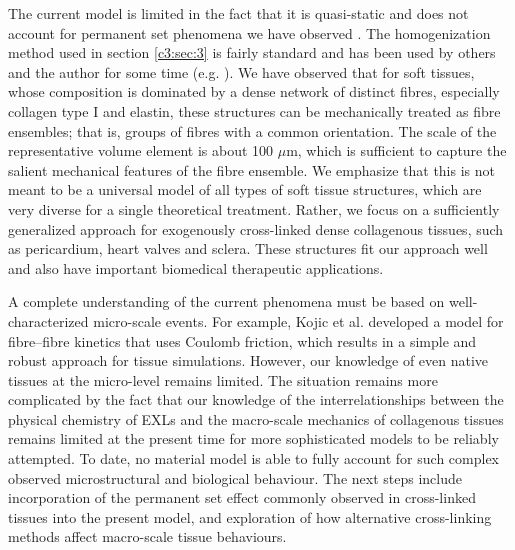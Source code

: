     The current model is limited in the fact that it is quasi-static and does not account for permanent set phenomena we have observed \cite{sun_response_2004}. The homogenization method used in section \ref{c3:sec:3} is fairly standard and has been used by others and the author for some time (e.g. \cite{sacks_incorporation_2003}\cite{fata_insights_2014}\cite{fan_simulation_2014}). We have observed that for soft tissues, whose composition is dominated by a dense network of distinct fibres, especially collagen type I and elastin, these structures can be mechanically treated as fibre ensembles; that is, groups of fibres with a common orientation. The scale of the representative volume element is about 100 $\mu$m, which is sufficient to capture the salient mechanical features of the fibre ensemble. We emphasize that this is not meant to be a universal model of all types of soft tissue structures, which are very diverse for a single theoretical treatment. Rather, we focus on a sufficiently generalized approach for exogenously cross-linked dense collagenous tissues, such as pericardium, heart valves and sclera. These structures fit our approach well and also have important biomedical therapeutic applications.


    A complete understanding of the current phenomena must be based on well-characterized micro-scale events. For example, Kojic et al. \cite{kojic_numerical_1998} developed a model for fibre–fibre kinetics that uses Coulomb friction, which results in a simple and robust approach for tissue simulations. However, our knowledge of even native tissues at the micro-level remains limited. The situation remains more complicated by the fact that our knowledge of the interrelationships between the physical chemistry of EXLs and the macro-scale mechanics of collagenous tissues remains limited at the present time for more sophisticated models to be reliably attempted. To date, no material model is able to fully account for such complex observed microstructural and biological behaviour. The next steps include incorporation of the permanent set effect commonly observed in cross-linked tissues into the present model, and exploration of how alternative cross-linking methods affect macro-scale tissue behaviours.